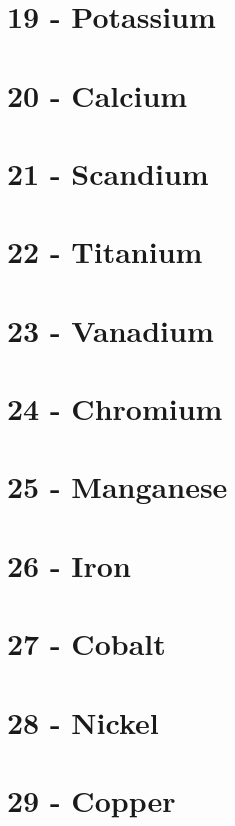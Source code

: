 \documentclass{book}
\begin{document}
\section{19 - Potassium}
\label{sec:elem-potassium}

\section{20 - Calcium}
\label{sec:elem-calcium}

\section{21 - Scandium}
\label{sec:elem-scandium}

\section{22 - Titanium}
\label{sec:elem-titanium}

\section{23 - Vanadium}
\label{sec:elem-vanadium}

\section{24 - Chromium}
\label{sec:elem-chromium}

\section{25 - Manganese}
\label{sec:elem-manganese}

\section{26 - Iron}
\label{sec:elem-iron}

\section{27 - Cobalt}
\label{sec:elem-cobalt}

\section{28 - Nickel}
\label{sec:elem-nickel}

\section{29 - Copper}
\label{sec:elem-copper}
\end{document}
